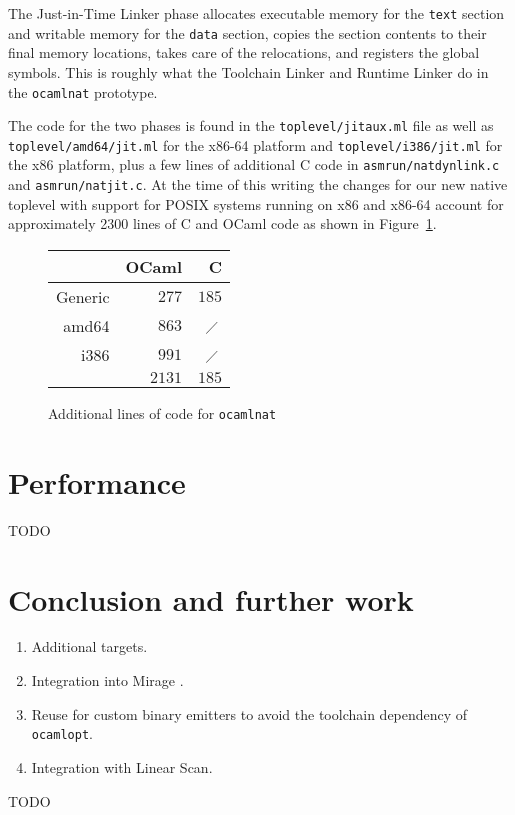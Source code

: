 \documentclass[10pt,a4paper,draft,twocolumn]{article}
\begin{document}
The Just-in-Time Linker phase allocates executable memory for the \texttt{text} section and writable
memory for the \texttt{data} section, copies the section contents to their final memory locations,
takes care of the relocations, and registers the global symbols. This is roughly what the Toolchain
Linker and Runtime Linker do in the \texttt{ocamlnat} prototype.

The code for the two phases is found in the \texttt{toplevel/jitaux.ml} file as well as
\texttt{toplevel/amd64/jit.ml} for the x86-64 platform and \texttt{toplevel/i386/jit.ml} for the x86
platform, plus a few lines of additional C code in \texttt{asmrun/natdynlink.c} and \texttt{asmrun/natjit.c}.
At the time of this writing the changes for our new native toplevel with support for POSIX systems running
on x86 and x86-64 account for approximately 2300 lines of C and OCaml code as shown in
Figure~\ref{fig:Additional_lines_of_code_for_ocamlnat}.

\begin{figure}[htb]
  \centering
  \begin{tabular}{r|rr}
    & OCaml & C \\
    \hline
    Generic & $277$ & $185$ \\
    amd64 & $863$ & $\diagup$\, \\
    i386 & $991$ & $\diagup$\, \\
    \hline
    & $2131$ & $185$ \\
  \end{tabular}
  \caption{Additional lines of code for \texttt{ocamlnat}}
  \label{fig:Additional_lines_of_code_for_ocamlnat}
\end{figure}


\section{Performance} \label{section:Performance}

TODO


\section{Conclusion and further work} \label{section:Conclusion_and_further_work}

\begin{enumerate}
\item Additional targets.
\item Integration into Mirage \cite{Mirage11,Madhavapeddy10,Madhavapeddy10hotcloud}.
\item Reuse for custom binary emitters to avoid the toolchain dependency of \texttt{ocamlopt}.
\item Integration with Linear Scan.
\end{enumerate}

TODO




\end{document}
